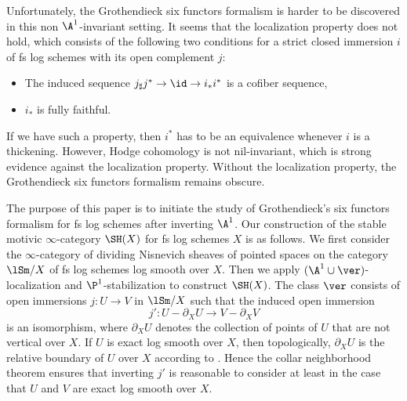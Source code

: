 \documentclass[10pt]{amsart}
\begin{document}
Unfortunately, the Grothendieck six functors formalism is harder to be discovered in this non $\A^1$-invariant setting.
It seems that the localization property does not hold, which consists of the following two conditions for a strict closed immersion $i$ of fs log schemes with its open complement $j$:
\begin{itemize}
\item The induced sequence $j_\sharp j^*\to \id \to i_*i^*$ is a cofiber sequence,
\item $i_*$ is fully faithful.
\end{itemize}
If we have such a property, then $i^*$ has to be an equivalence whenever $i$ is a thickening.
However, Hodge cohomology is not nil-invariant, which is strong evidence against the localization property.
Without the localization property, the Grothendieck six functors formalism remains obscure.

The purpose of this paper is to initiate the study of Grothendieck's six functors formalism for fs log schemes after inverting $\A^1$.
Our construction of the stable motivic $\infty$-category $\SH(X)$ for fs log schemes $X$ is as follows.
We first consider the $\infty$-category of dividing Nisnevich sheaves \cite[Definition 3.1.5]{logDM} of pointed spaces on the category $\lSm/X$ of fs log schemes log smooth over $X$.
Then we apply $(\A^1\cup \ver)$-localization and $\P^1$-stabilization to construct $\SH(X)$.
The class $\ver$ consists of open immersions $j\colon U\to V$ in $\lSm/X$ such that the induced open immersion
\[
j'\colon U-\partial_X U\to V-\partial_X V
\]
is an isomorphism, where $\partial_X U$ denotes the collection of points of $U$ that are not vertical over $X$.
If $U$ is exact log smooth over $X$, then topologically, $\partial_X U$ is the relative boundary of $U$ over $X$ according to \cite[Theorem 3.7]{zbMATH05809283}.
Hence the collar neighborhood theorem ensures that inverting $j'$ is reasonable to consider at least in the case that $U$ and $V$ are exact log smooth over $X$.
\end{document}
